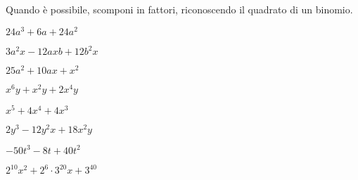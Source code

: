 \begin{esercizio}[*]
\label{ese:div.021}
Quando è possibile, scomponi in fattori, riconoscendo il quadrato di un 
binomio.
\begin{htmulticols}{2}
\begin{enumeratea}
\item \(24a^{3}+6a+24a^{2}\) 
\item \(3a^{2}x-12axb+12b^{2}x\) 
\item \(25a^{2}+10ax+x^{2}\) 
\item \(x^{6}y+x^{2}y+2x^{4}y\) 
\item \(x^{5}+4x^{4}+4x^{3}\) 
\item \(2y^{3}-12y^{2}x+18x^{2}y\) 
\item \(-50t^{3}-8t+40t^{2}\) 
\item \(2^{10}x^{2}+2^{6}\cdot 3^{20}x+3^{40}\) 
\end{enumeratea}
\end{htmulticols}
\end{esercizio}



\paragraph*{}

